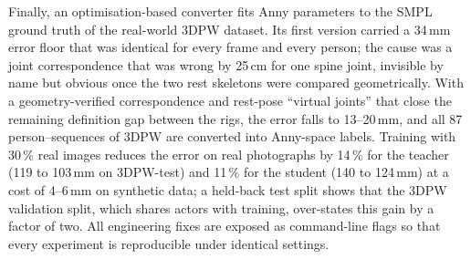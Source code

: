 Finally, an optimisation-based converter fits Anny parameters to the SMPL
ground truth of the real-world 3DPW dataset. Its first version carried a
34\,mm error floor that was identical for every frame and every person; the
cause was a joint correspondence that was wrong by 25\,cm for one spine joint,
invisible by name but obvious once the two rest skeletons were compared
geometrically. With a geometry-verified correspondence and rest-pose
``virtual joints'' that close the remaining definition gap between the rigs,
the error falls to 13--20\,mm, and all 87 person--sequences of 3DPW are
converted into Anny-space labels. Training with 30\,\% real images reduces the
error on real photographs by 14\,\% for the teacher (119 to 103\,mm on
3DPW-test) and 11\,\% for the student (140 to 124\,mm) at a cost of 4--6\,mm on
synthetic data; a held-back test split shows that the 3DPW validation split,
which shares actors with training, over-states this gain by a factor of two.
All engineering fixes are exposed as command-line flags so that every
experiment is reproducible under identical settings.
